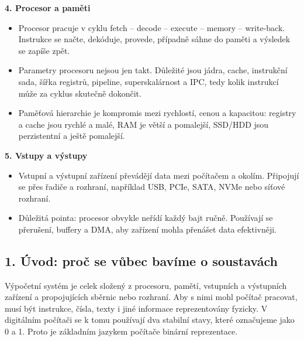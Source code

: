 \textbf{4. Procesor a paměti}
\begin{itemize}
  \item Procesor pracuje v cyklu fetch -- decode -- execute -- memory -- write-back. Instrukce se načte, dekóduje, provede, případně sáhne do paměti a výsledek se zapíše zpět.
  \item Parametry procesoru nejsou jen takt. Důležité jsou jádra, cache, instrukční sada, šířka registrů, pipeline, superskalárnost a IPC, tedy kolik instrukcí může za cyklus skutečně dokončit.
  \item Paměťová hierarchie je kompromis mezi rychlostí, cenou a kapacitou: registry a cache jsou rychlé a malé, RAM je větší a pomalejší, SSD/HDD jsou perzistentní a ještě pomalejší.
\end{itemize}

\textbf{5. Vstupy a výstupy}
\begin{itemize}
  \item Vstupní a výstupní zařízení převádějí data mezi počítačem a okolím. Připojují se přes řadiče a rozhraní, například USB, PCIe, SATA, NVMe nebo síťové rozhraní.
  \item Důležitá pointa: procesor obvykle neřídí každý bajt ručně. Používají se přerušení, buffery a DMA, aby zařízení mohla přenášet data efektivněji.
\end{itemize}


\subsection*{1. Úvod: proč se vůbec bavíme o soustavách}

Výpočetní systém je celek složený z procesoru, pamětí, vstupních a výstupních zařízení a propojujících sběrnic nebo rozhraní. Aby s nimi mohl počítač pracovat, musí být instrukce, čísla, texty i jiné informace reprezentovány fyzicky. V digitálním počítači se k tomu používají dva stabilní stavy, které označujeme jako 0 a 1. Proto je základním jazykem počítače binární reprezentace.

